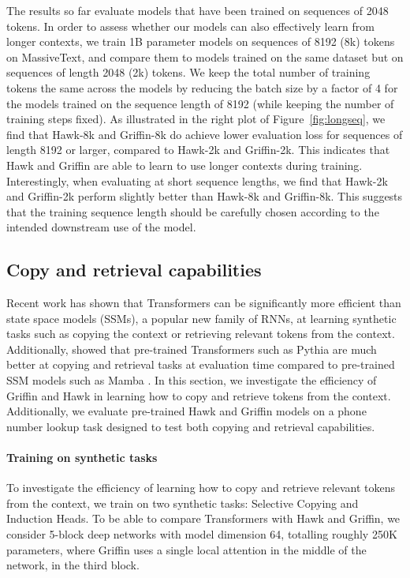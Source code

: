 The results so far evaluate models that have been trained on sequences of 2048 tokens. In order to assess whether our models can also effectively learn from longer contexts, we train 1B parameter models on sequences of 8192 (8k) tokens on MassiveText, and compare them to models trained on the same dataset but on sequences of length 2048 (2k) tokens. We keep the total number of training tokens the same across the models by reducing the batch size by a factor of 4 for the models trained on the sequence length of 8192 (while keeping the number of training steps fixed). As illustrated in the right plot of Figure~\ref{fig:longseq}, we find that Hawk-8k and Griffin-8k do achieve lower evaluation loss for sequences of length 8192 or larger, compared to Hawk-2k and Griffin-2k. This indicates that Hawk and Griffin are able to learn to use longer contexts during training. Interestingly, when evaluating at short sequence lengths, we find that Hawk-2k and Griffin-2k perform slightly better than Hawk-8k and Griffin-8k. This suggests that the training sequence length should be carefully chosen according to the intended downstream use of the model.

\subsection{Copy and retrieval capabilities}

Recent work \citep{jelassi2024repeat} has shown that Transformers can be significantly more efficient than state space models (SSMs), a popular new family of RNNs, at learning synthetic tasks such as copying the context or retrieving relevant tokens from the context. Additionally, \citet{jelassi2024repeat} showed that pre-trained Transformers such as Pythia \citep{biderman2023pythia} are much better at copying and retrieval tasks at evaluation time compared to pre-trained SSM models such as Mamba \citep{gu2023mamba}. In this section, we investigate the efficiency of Griffin and Hawk in learning how to copy and retrieve tokens from the context. Additionally, we evaluate pre-trained Hawk and Griffin models on a phone number lookup task designed to test both copying and retrieval capabilities.

\paragraph{Training on synthetic tasks} 

To investigate the efficiency of learning how to copy and retrieve relevant tokens from the context, we train on two synthetic tasks: Selective Copying and Induction Heads. To be able to compare Transformers with Hawk and Griffin, we consider 5-block deep networks with model dimension 64, totalling roughly 250K parameters, where Griffin uses a single local attention in the middle of the network, in the third block.

